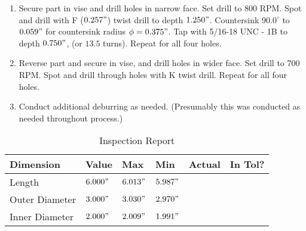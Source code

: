 \documentclass{article}
\begin{document}
\begin{enumerate}[resume]
	\item Secure part in vise and drill holes in narrow face.  Set drill to 800 RPM.  Spot and drill with F ($0.257"$) twist drill to depth $1.250"$.  Countersink $90.0^{\circ}$ to $0.059"$ for countersink radius $\phi = 0.375"$.  Tap with 5/16-18 UNC - 1B to depth $0.750"$, (or $13.5$ turns). Repeat for all four holes.

	\item Reverse part and secure in vise, and drill holes in wider face.  Set drill to 700 RPM.  Spot and drill through holes with K twist drill.  Repeat for all four holes.

	\item Conduct additional deburring as needed. (Presumably this was conducted as needed throughout process.)

\end{enumerate}

\newpage

\begin{table}[ht]
	\centering
	\caption{Inspection Report}
	\renewcommand\arraystretch{3}
	\begin{tabular}{l | m{2cm} | m{2cm} | m{2cm} | m{2cm} | m{2cm} |}
		Dimension & Value & Max & Min & Actual & In Tol? \\
		\hline
		Length & $6.000"$ & $6.013"$ & $5.987"$ && \\
		\hline
		Outer Diameter & $3.000"$ & $3.030"$ & $2.970"$ && \\
		\hline
		Inner Diameter & $2.000"$ & $2.009"$ & $1.991"$ && \\
		\hline
	\end{tabular}
\end{table}
\end{document}
